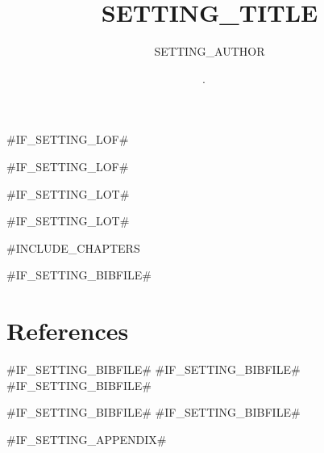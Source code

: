 \documentclass[SETTING_FONTSIZE, paper=SETTING_PAPERSIZE, parskip, oneside]{scrreprt}
\title{SETTING_TITLE} %
\author{SETTING_AUTHOR} %
\date{\the\day .~\monthname~\the\year}
\begin{document}
\maketitle
\makeabstract
\tableofcontents
{} %
#IF_SETTING_LOF#\listoffigures
#IF_SETTING_LOF# %
#IF_SETTING_LOT#\listoftables
#IF_SETTING_LOT# %
\clearpage
\setcounter{romanPages}{\value{page}} %


#INCLUDE_CHAPTERS

#IF_SETTING_BIBFILE#\chapter*{References} %
#IF_SETTING_BIBFILE#\renewcommand{\thepage}{\roman{page}} %
#IF_SETTING_BIBFILE#\setcounter{page}{\theromanPages} %
#IF_SETTING_BIBFILE# %
#IF_SETTING_BIBFILE# %
#IF_SETTING_BIBFILE#\printbibliography[heading=bibempty] %

#IF_SETTING_APPENDIX#
\end{document}
